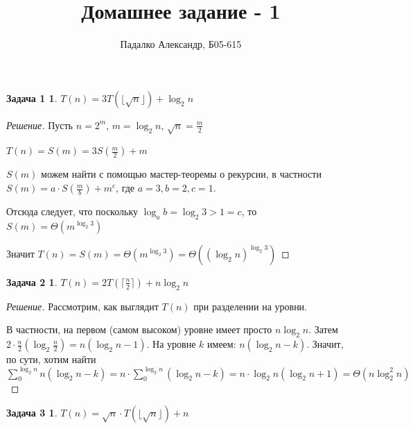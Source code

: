 \documentclass[12pt]{article}
\title{Домашнее задание - 1}
\author{Падалко Александр, Б05-615}
\newenvironment{solution}{\begin{proof}[Решение]}{\end{proof}}
\newtheorem*{task_1}{Задача 1}
\newtheorem*{task_2}{Задача 2}
\newtheorem*{task_3}{Задача 3}
\begin{document}
\maketitle





\begin{task_1}
		
	$T(n) = 3T(\lfloor\sqrt{n}\rfloor) + \log_2{n}$

\end{task_1}

\begin{solution}
		
	Пусть $n = 2^m$, $m = \log_2{n}$, 
	$\sqrt{n} = \frac{m}{2}$

	$T(n) = S(m) = 3S(\frac{m}{2}) + m$

	$S(m)$ можем найти с помощью мастер-теоремы о рекурсии,
	в частности $S(m) = a \cdot S(\frac{m}{b}) + {m^c}$, где $a = 3, b = 2, c = 1$.

	Отсюда следует, что поскольку $\log_{a}{b} = \log_2{3} > 1 = c$, то
	$S(m) = \Theta({m^{\log_2{3}}})$

	Значит $T(n) = S(m) = \Theta(m^{\log_2{3}}) 
	= \Theta(({\log_2{n}}) ^ {\log_2{3}})$

\end{solution}





\begin{task_2}

	$T(n) = 2T(\lceil\frac{n}{2}\rceil) + n\log_2{n}$

\end{task_2}

\begin{solution}

	Рассмотрим, как выглядит $T(n)$ при разделении на уровни.

	В частности, на первом (самом высоком) уровне имеет просто 
	$n \log_2{n}$. Затем $2\cdot\frac{n}{2}(\log_2{\frac{n}{2}}) = 
	n (\log_2{n} - 1)$. На уровне $k$ имеем: $n (\log_2{n} - k)$. Значит,
	по сути, хотим найти $\sum_{0}^{\log_2{n}} n (\log_2{n} - k) = 
	n \cdot \sum_{0}^{\log_2{n}} (\log_2{n} - k) = n \cdot \log_2{n} 
	(\log_2{n} + 1) = \Theta(n \log^2_2{n})$

\end{solution}






\begin{task_3}
	
	$T(n) = \sqrt{n} \cdot T(\lfloor \sqrt{n} \rfloor) + n$

\end{task_3}
\end{document}
